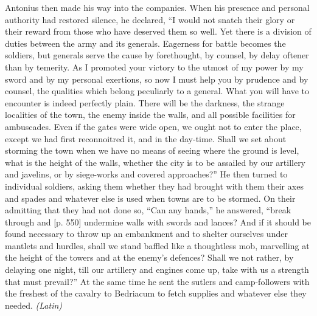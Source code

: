 Antonius then made his way into the companies. When his presence and personal authority had restored silence, he declared, ``I would not snatch their glory or their reward from those who have deserved them so well. Yet there is a division of duties between the army and its generals. Eagerness for battle becomes the soldiers, but generals serve the cause by forethought, by counsel, by delay oftener than by temerity. As I promoted your victory to the utmost of my power by my sword and by my personal exertions, so now I must help you by prudence and by counsel, the qualities which belong peculiarly to a general. What you will have to encounter is indeed perfectly plain. There will be the darkness, the strange localities of the town, the enemy inside the walls, and all possible facilities for ambuscades. Even if the gates were wide open, we ought not to enter the place, except we had first reconnoitred it, and in the day-time. Shall we set about storming the town when we have no means of seeing where the ground is level, what is the height of the walls, whether the city is to be assailed by our artillery and javelins, or by siege-works and covered approaches?'' He then turned to individual soldiers, asking them whether they had brought with them their axes and spades and whatever else is used when towns are to be stormed. On their admitting that they had not done so, ``Can any hands,'' he answered, ``break through and [p. 550] undermine walls with swords and lances? And if it should be found necessary to throw up an embankment and to shelter ourselves under mantlets and hurdles, shall we stand baffled like a thoughtless mob, marvelling at the height of the towers and at the enemy's defences? Shall we not rather, by delaying one night, till our artillery and engines come up, take with us a strength that must prevail?'' At the same time he sent the sutlers and camp-followers with the freshest of the cavalry to Bedriacum to fetch supplies and whatever else they needed. \emph{(Latin)}


